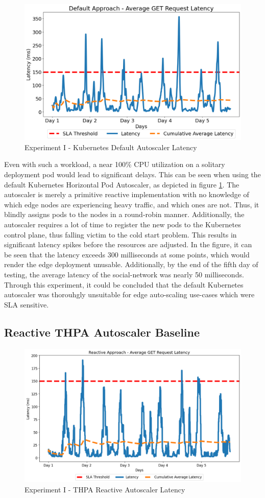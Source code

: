 \begin{figure}[htb]
    \centering
    \caption{Experiment I - Kubernetes Default Autoscaler Latency}
    \label{fig:exp1-default-k8s}
    \includegraphics[width=0.6\linewidth]{Figures/Home-Timeline-Default-Latency.png}
\end{figure}

Even with such a workload, a near 100\% CPU utilization on a solitary deployment pod would lead to significant delays. This can be seen when using the default Kubernetes Horizontal Pod Autoscaler, as depicted in figure \ref{fig:exp1-default-k8s}. The autoscaler is merely a primitive reactive implementation with no knowledge of which edge nodes are experiencing heavy traffic, and which ones are not. Thus, it blindly assigns pods to the nodes in a round-robin manner. Additionally, the autoscaler requires a lot of time to register the new pods to the Kubernetes control plane, thus falling victim to the cold start problem. This results in significant latency spikes before the resources are adjusted. In the figure, it can be seen that the latency exceeds 300 milliseconds at some points, which would render the edge deployment unusable. Additionally, by the end of the fifth day of testing, the average latency of the social-network was nearly 50 milliseconds. Through this experiment, it could be concluded that the default Kubernetes autoscaler was thorouhgly unsuitable for edge auto-scaling use-cases which were SLA sensitive.\par

\subsection {Reactive THPA Autoscaler Baseline}
\label{subsec:ch5-exp1-reactive-algo}

\begin{figure}[htb]
    \centering
    \caption{Experiment I - THPA Reactive Autoscaler Latency}
    \label{fig:exp1-reactive-k8s}
    \includegraphics[width=0.6\linewidth]{Figures/Home-Timeline-Reactive-Latency.png}
\end{figure}

